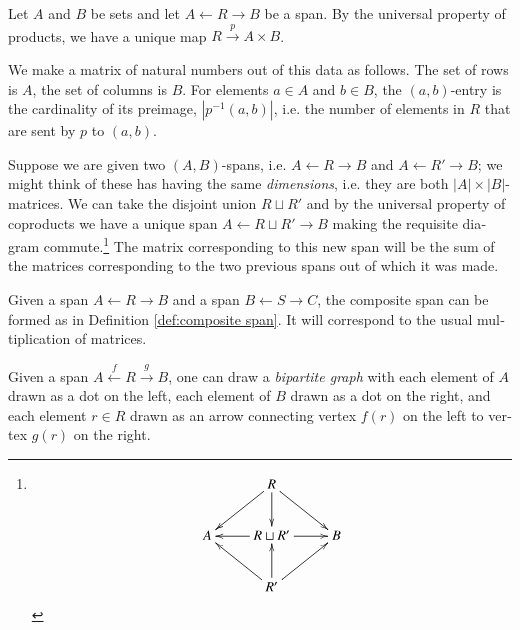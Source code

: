 \documentclass[a4paper]{book}
\def\to{\rightarrow}
\def\from{\leftarrow}
\def\m1{{-1}}
\newcommand{\To}[1]{\xrightarrow{#1}}
\newcommand{\From}[1]{\xleftarrow{#1}}
\theoremstyle{myth}
\newtheorem{constructionENG}[envENG]{\begin{english}Construction\end{english}}
\begin{document}
\begin{english}
\begin{russian} \end{russian}

Let $A$ and $B$ be sets and let $A\from R\to B$ be a span. By the universal property of products, we have a unique map $R\To{p}A\times B$. 

\begin{russian} \end{russian}

We make a matrix of natural numbers out of this data as follows. The set of rows is $A$, the set of columns is $B$. For elements $a\in A$ and $b\in B$, the $(a,b)$-entry is the cardinality of its preimage, $|p^\m1(a,b)|$, i.e. the number of elements in $R$ that are sent by $p$ to $(a,b)$. 

\begin{russian} \end{russian}

Suppose we are given two $(A,B)$-spans, i.e. $A\from R\to B$ and $A\from R'\to B$; we might think of these has having the same {\em dimensions}, i.e. they are both $|A|\times|B|$-matrices. We can take the disjoint union $R\sqcup R'$ and by the universal property of coproducts we have a unique span $A\from R\sqcup R'\to B$ making the requisite diagram commute.\footnote{
$$\xymatrix{
&R\ar[dl]\ar[dr]\ar[d]\\
A&R\sqcup R'\ar[l]\ar[r]&B\\
&R'\ar[ur]\ar[ul]\ar[u]}
$$
}
The matrix corresponding to this new span will be the sum of the matrices corresponding to the two previous spans out of which it was made.

\begin{russian} \end{russian}

Given a span $A\from R\to B$ and a span $B\from S\to C$, the composite span can be formed as in Definition \ref{def:composite span}. It will correspond to the usual multiplication of matrices.

\begin{russian} \end{russian}

\begin{constructionENG}\label{const:bipartite}
Given a span $A\From{f} R\To{g} B$, one can draw a {\em bipartite graph} with each element of $A$ drawn as a dot on the left, each element of $B$ drawn as a dot on the right, and each element $r\in R$ drawn as an arrow connecting vertex $f(r)$ on the left to vertex $g(r)$ on the right.
\end{constructionENG}


\end{english}
\end{document}
